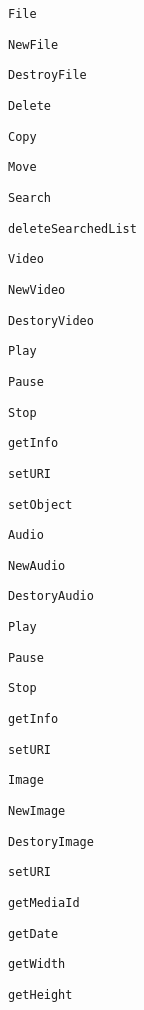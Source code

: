 \begin{DoxyItemize}
\item {\tt File}
\begin{DoxyItemize}
\item {\tt New\-File}
\item {\tt Destroy\-File}
\item {\tt Delete}
\item {\tt Copy}
\item {\tt Move}
\item {\tt Search}
\item {\tt delete\-Searched\-List}
\end{DoxyItemize}
\item {\tt Video}
\begin{DoxyItemize}
\item {\tt New\-Video}
\item {\tt Destory\-Video}
\item {\tt Play}
\item {\tt Pause}
\item {\tt Stop}
\item {\tt get\-Info}
\item {\tt set\-U\-R\-I}
\item {\tt set\-Object}
\end{DoxyItemize}
\item {\tt Audio}
\begin{DoxyItemize}
\item {\tt New\-Audio}
\item {\tt Destory\-Audio}
\item {\tt Play}
\item {\tt Pause}
\item {\tt Stop}
\item {\tt get\-Info}
\item {\tt set\-U\-R\-I}
\end{DoxyItemize}
\item {\tt Image}
\begin{DoxyItemize}
\item {\tt New\-Image}
\item {\tt Destory\-Image}
\item {\tt set\-U\-R\-I}
\item {\tt get\-Media\-Id}
\item {\tt get\-Date}
\item {\tt get\-Width}
\item {\tt get\-Height}
\end{DoxyItemize}
\end{DoxyItemize}

